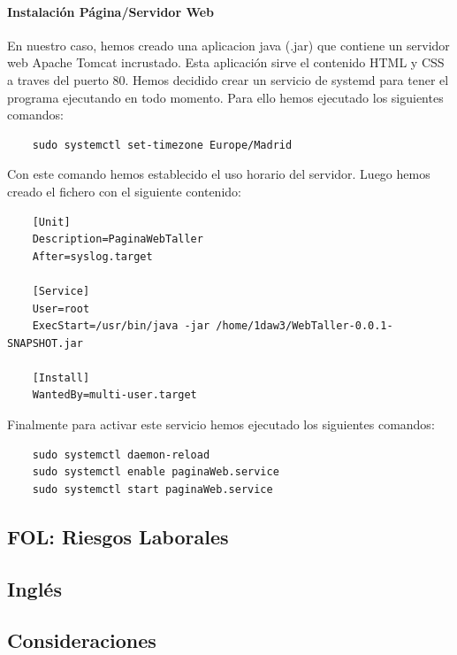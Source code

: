 \documentclass{article}
\begin{document}
{  \paragraph{Instalación Página/Servidor Web}
  En nuestro caso, hemos creado una aplicacion java (.jar) que contiene un servidor web Apache Tomcat incrustado. Esta 
  aplicación sirve el contenido HTML y CSS a traves del puerto 80. Hemos decidido crear un servicio de systemd para tener 
  el programa ejecutando en todo momento. Para ello hemos ejecutado los siguientes comandos: 
  \begin{lstlisting}
    sudo systemctl set-timezone Europe/Madrid
  \end{lstlisting}
  Con este comando hemos establecido el uso horario del servidor.
  Luego hemos creado el fichero  con el siguiente contenido: 
  \begin{lstlisting}
    [Unit]
    Description=PaginaWebTaller
    After=syslog.target

    [Service]
    User=root
    ExecStart=/usr/bin/java -jar /home/1daw3/WebTaller-0.0.1-SNAPSHOT.jar

    [Install]
    WantedBy=multi-user.target  
  \end{lstlisting}
  Finalmente para activar este servicio hemos ejecutado los siguientes comandos:
  \begin{lstlisting}
    sudo systemctl daemon-reload
    sudo systemctl enable paginaWeb.service
    sudo systemctl start paginaWeb.service
  \end{lstlisting}
}
\subsection{FOL: Riesgos Laborales}
\subsection{Inglés}
\subsection{Consideraciones}
\end{document}
